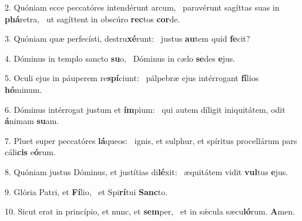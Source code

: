2. Quóniam ecce peccatóres intendérunt arcum, \dag\  paravérunt sagíttas suas in \textbf{phá}retra, \ast\  ut sagíttent in obscúro \textbf{rec}tos \textbf{cor}de.\

3. Quóniam quæ perfecísti, destru\textbf{xé}runt: \ast\  justus \textbf{au}tem quid \textbf{fe}cit?\

4. Dóminus in templo sancto \textbf{su}o, \ast\  Dóminus in cælo \textbf{se}des \textbf{e}jus.\

5. Oculi ejus in páuperem re\textbf{spí}ciunt: \ast\  pálpebræ ejus intérrogant \textbf{fí}lios \textbf{hó}minum.\

6. Dóminus intérrogat justum et \textbf{ím}pium: \ast\  qui autem díligit iniquitátem, odit \textbf{á}nimam \textbf{su}am.\

7. Pluet super peccatóres \textbf{lá}queos: \ast\  ignis, et sulphur, et spíritus procellárum pars cáli\textbf{cis} e\textbf{ó}rum.\

8. Quóniam justus Dóminus, et justítias di\textbf{lé}xit: \ast\  æquitátem vidit \textbf{vul}tus \textbf{e}jus.\

9. Glória Patri, et \textbf{Fí}lio, \ast\  et Spi\textbf{rí}tui \textbf{Sanc}to.\

10. Sicut erat in princípio, et nunc, et \textbf{sem}per, \ast\  et in sǽcula sæcu\textbf{ló}rum. \textbf{A}men.\

